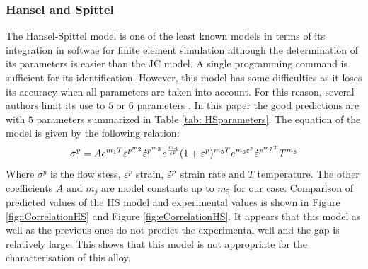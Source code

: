 \documentclass[twoside,english,1p,final,sort&compress]{elsarticle}
\theoremstyle{plain}
\newcommand{\mdot}[1]{\accentset{\mbox{\bfseries .}}{#1}}
\begin{document}
\subsubsection{Hansel and Spittel\label{sec:HSmodel}}
The Hansel-Spittel model is one of the least known models in terms of its  integration in softwae for finite element simulation although the determination of its parameters is easier than the JC model. A single programming command is sufficient for its identification. However, this model has some difficulties as it loses its accuracy when all parameters are taken into account. For this reason, several authors limit its use to $5$ or $6$ parameters \cite{chadha2018approach, rudnytskyj2020constitutive, el2015comparison}. In this paper the good predictions are with $5$ parameters summarized in Table \ref{tab: HSparameters}. The equation of the model is given by the following relation: 
\begin{equation}
\sigma^y = Ae^{m_1T}\varepsilon^{p^{m_2}}\mdot{\varepsilon}^{p^{m_3}}e^{\frac{m_4}{\varepsilon^p}}(1+\varepsilon^p)^{m_5T}e^{m_6\varepsilon^p}\mdot{\varepsilon}^{p^{m_7T}}T^{m_8}
\end{equation}
Where $\sigma^y$ is the flow stess, $\varepsilon^p$ strain, $\mdot{\varepsilon}^p$ strain rate and $T$ temperature. The other coefficients $A$ and $m_j$ are model constants up to $m_5$ for our case. Comparison of predicted values of the HS model and experimental values is shown in Figure \ref{fig:iCorrelationHS} and Figure \ref{fig:eCorrelationHS}. It appears that this model as well as the previous ones do not predict the experimental well and the gap is relatively large. This shows that this model is not appropriate for the characterisation of this alloy.
\begin{table}[h!]
\centering{}
\caption{Parameters' constants of Hansel and Spittel Model}
\end{table}
\end{document}
